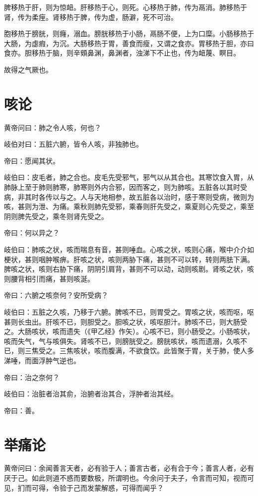 \documentclass{article}%
\begin{document}
脾移热于肝，则为惊衄。肝移热于心，则死。心移热于肺，传为鬲消。肺移热于肾，传为柔痓。肾移热于脾，传为虚，肠澼，死不可治。

胞移热于膀胱，则癃，溺血。膀胱移热于小肠，鬲肠不便，上为口糜。小肠移热于大肠，为虙瘕，为沉。大肠移热于胃，善食而瘦，又谓之食亦。胃移热于胆，亦曰食亦。胆移热于脑，则辛頞鼻渊，鼻渊者，浊涕下不止也，传为衄蔑、瞑目。

故得之气厥也。
\section{咳论}
黄帝问曰：肺之令人咳，何也？

岐伯对曰：五脏六腑，皆令人咳，非独肺也。

帝曰：愿闻其状。

岐伯曰：皮毛者，肺之合也。皮毛先受邪气，邪气以从其合也。其寒饮食入胃，从肺脉上至于肺则肺寒，肺寒则外内合邪，因而客之，则为肺咳。五脏各以其时受病，非其时各传以与之。人与天地相参，故五脏各以治时，感于寒则受病，微则为咳，甚则为泄、为痛。乘秋则肺先受邪，乘春则肝先受之，乘夏则心先受之，乘至阴则脾先受之，乘冬则肾先受之。

帝曰：何以异之？

岐伯曰：肺咳之状，咳而喘息有音，甚则唾血。心咳之状，咳则心痛，喉中介介如梗状，甚则咽肿喉痹。肝咳之状，咳则两胁下痛，甚则不可以转，转则两胠下满。脾咳之状，咳则右胁下痛，阴阴引肩背，甚则不可以动，动则咳剧。肾咳之状，咳则腰背相引而痛，甚则咳涎。

帝曰：六腑之咳奈何？安所受病？

岐伯曰：五脏之久咳，乃移于六腑。脾咳不已，则胃受之。胃咳之状，咳而呕，呕甚则长虫出。肝咳不已，则胆受之。胆咳之状，咳呕胆汁。肺咳不已，则大肠受之。大肠咳状，咳而遗失（《甲乙经》作矢）。心咳不已，则小肠受之。小肠咳状，咳而失气，气与咳俱失。肾咳不已，则膀胱受之。膀胱咳状，咳而遗溺，久咳不已，则三焦受之。三焦咳状，咳而腹满，不欲食饮。此皆聚于胃，关于肺，使人多涕唾，而面浮肿气逆也。

帝曰：治之奈何？

岐伯曰：治脏者治其俞，治腑者治其合，浮肿者治其经。

帝曰：善。


\section{举痛论}
黄帝问曰：余闻善言天者，必有验于人；善言古者，必有合于今；善言人者，必有厌于己。如此则道不惑而要数极，所谓明也。今余问于夫子，令言而可知，视而可见，扪而可得，令验于己而发蒙解惑，可得而闻乎？
\end{document}
